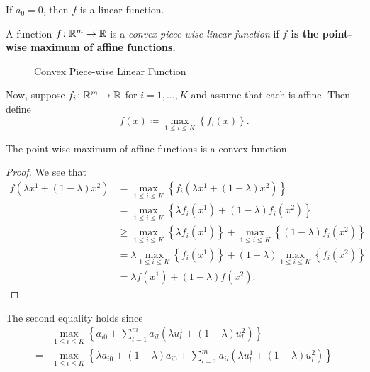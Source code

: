 \begin{remark}
	If \(a_0 = 0\), then \(f\) is a linear function.
\end{remark}

\begin{definition}
	A function \(f\colon \mathbb{\MakeUppercase{R}}^{m}\to \mathbb{\MakeUppercase{R}}\) is a \emph{convex piece-wise linear function} if
	\textbf{\(f\) is the point-wise maximum of affine functions.}
\end{definition}

\begin{figure}[H]
	\centering
	\caption{Convex Piece-wise Linear Function}
	\label{fig:convex-piecewise-linear-function}
\end{figure}

Now, suppose \(f_{i}\colon \mathbb{\MakeUppercase{R}}^m \to \mathbb{\MakeUppercase{R}}\) for \(i = 1, \ldots , K\) and assume that each is affine. Then define
\[
	f(x)\coloneqq \max_{1\leq i\leq K} \left\{ f_i(x) \right\}.
\]

\begin{theorem}
	The point-wise maximum of affine functions is a convex function.
\end{theorem}

\begin{proof}
	We see that
	\[
		\begin{split}
			f(\lambda x^1 + (1 - \lambda)x^2) &=\max_{1\leq i\leq K}\left\{ f_i(\lambda x^1 + (1 - \lambda)x^2) \right\}\\
			&=\max_{1\leq i\leq K}\left\{ \lambda f_{i}(x^1) + (1 - \lambda)f_{i}(x^2) \right\}\\
			&\geq \max_{1\leq i\leq K}\left\{ \lambda f_{i}(x^1)\right\} + \max_{1\leq i\leq K}\left\{(1 - \lambda)f_{i}(x^2) \right\}\\
			&=\lambda\max_{1\leq i\leq K}\left\{f_{i}(x^1)\right\} + (1 - \lambda)\max_{1\leq i\leq K}\left\{f_{i}(x^2) \right\}\\
			&= \lambda f(x^1)+(1 - \lambda)f(x^2).
		\end{split}
	\]
\end{proof}

\begin{remark}
	The second equality holds since
	\[
		\begin{split}
			&\max_{1\leq i\leq K}\left\{ a_{i0}+\sum\limits_{l=1}^{m} a_{il}(\lambda u^1_l + (1 - \lambda)u^2_l) \right\}\\
			= &\max_{1\leq i\leq K}\left\{ \lambda a_{i0}+(1 - \lambda)a_{i0} + \sum\limits_{l=1}^{m} a_{il}(\lambda u^1_l + (1 - \lambda)u^2_l) \right\}
		\end{split}
	\]
\end{remark}
